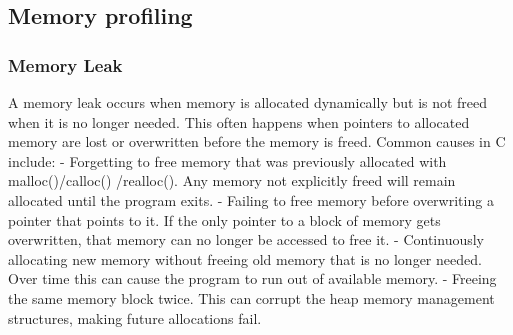 \documentclass [ titlepage ]{article}
\begin{document}
\subsection{Memory profiling}
\subsubsection{Memory Leak}
A memory leak occurs when memory is allocated dynamically but is not freed when it is no longer needed. This often happens when pointers to allocated memory are lost or overwritten before the memory is freed. Common causes in C include: \newline
- Forgetting to free memory that was previously allocated with malloc()/calloc()  /realloc(). Any memory not explicitly freed will remain allocated until the program exits. \newline
- Failing to free memory before overwriting a pointer that points to it. If the only pointer to a block of memory gets overwritten, that memory can no longer be accessed to free it. \newline
- Continuously allocating new memory without freeing old memory that is no longer needed. Over time this can cause the program to run out of available memory. \newline
- Freeing the same memory block twice. This can corrupt the heap memory management structures, making future allocations fail. \newline
\end{document}
